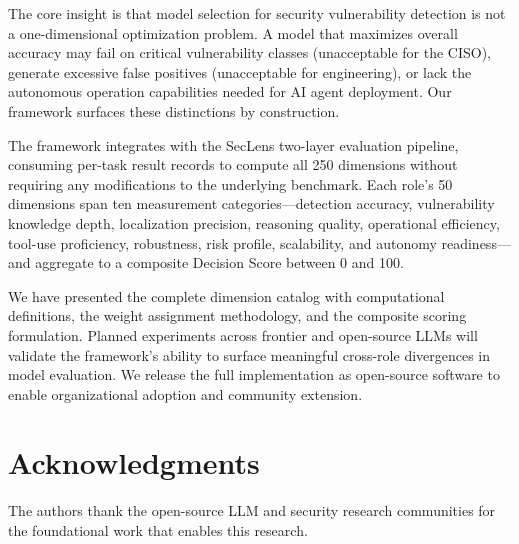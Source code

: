 \documentclass[10pt,twocolumn]{article}
\newcommand{\seclens}{SecLens\xspace}
\begin{document}
The core insight is that model selection for security vulnerability detection is not a one-dimensional optimization problem. A model that maximizes overall accuracy may fail on critical vulnerability classes (unacceptable for the CISO), generate excessive false positives (unacceptable for engineering), or lack the autonomous operation capabilities needed for AI agent deployment. Our framework surfaces these distinctions by construction.

The framework integrates with the \seclens two-layer evaluation pipeline, consuming per-task result records to compute all 250 dimensions without requiring any modifications to the underlying benchmark. Each role's 50 dimensions span ten measurement categories---detection accuracy, vulnerability knowledge depth, localization precision, reasoning quality, operational efficiency, tool-use proficiency, robustness, risk profile, scalability, and autonomy readiness---and aggregate to a composite Decision Score between 0 and 100.

We have presented the complete dimension catalog with computational definitions, the weight assignment methodology, and the composite scoring formulation. Planned experiments across frontier and open-source LLMs will validate the framework's ability to surface meaningful cross-role divergences in model evaluation. We release the full implementation as open-source software to enable organizational adoption and community extension.

\section*{Acknowledgments}

The authors thank the open-source LLM and security research communities for the foundational work that enables this research.


\end{document}
